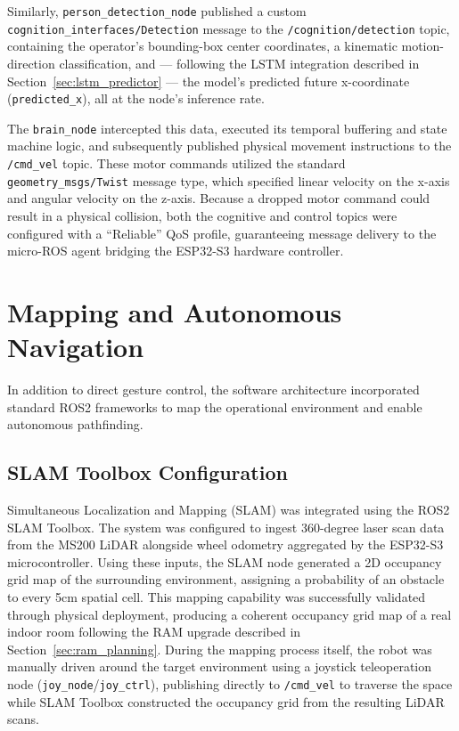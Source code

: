 Similarly, \texttt{person\_detection\_node} published a custom \texttt{cognition\_interfaces/Detection} message to the \texttt{/cognition/detection} topic, containing the operator's bounding-box center coordinates, a kinematic motion-direction classification, and — following the LSTM integration described in Section~\ref{sec:lstm_predictor} — the model's predicted future x-coordinate (\texttt{predicted\_x}), all at the node's inference rate.

The \texttt{brain\_node} intercepted this data, executed its temporal buffering and state machine logic, and subsequently published physical movement instructions to the \texttt{/cmd\_vel} topic. These motor commands utilized the standard \texttt{geometry\_msgs/Twist} message type, which specified linear velocity on the x-axis and angular velocity on the z-axis. Because a dropped motor command could result in a physical collision, both the cognitive and control topics were configured with a ``Reliable'' QoS profile, guaranteeing message delivery to the micro-ROS agent bridging the ESP32-S3 hardware controller.

\section{Mapping and Autonomous Navigation}
In addition to direct gesture control, the software architecture incorporated standard ROS2 frameworks to map the operational environment and enable autonomous pathfinding.

\subsection{SLAM Toolbox Configuration}
Simultaneous Localization and Mapping (SLAM) was integrated using the ROS2 SLAM Toolbox. The system was configured to ingest 360-degree laser scan data from the MS200 LiDAR alongside wheel odometry aggregated by the ESP32-S3 microcontroller. Using these inputs, the SLAM node generated a 2D occupancy grid map of the surrounding environment, assigning a probability of an obstacle to every 5cm spatial cell. This mapping capability was successfully validated through physical deployment, producing a coherent occupancy grid map of a real indoor room following the RAM upgrade described in Section~\ref{sec:ram_planning}. During the mapping process itself, the robot was manually driven around the target
environment using a joystick teleoperation node (\texttt{joy\_node}/\texttt{joy\_ctrl}),
publishing directly to \texttt{/cmd\_vel} to traverse the space while SLAM Toolbox
constructed the occupancy grid from the resulting LiDAR scans.

